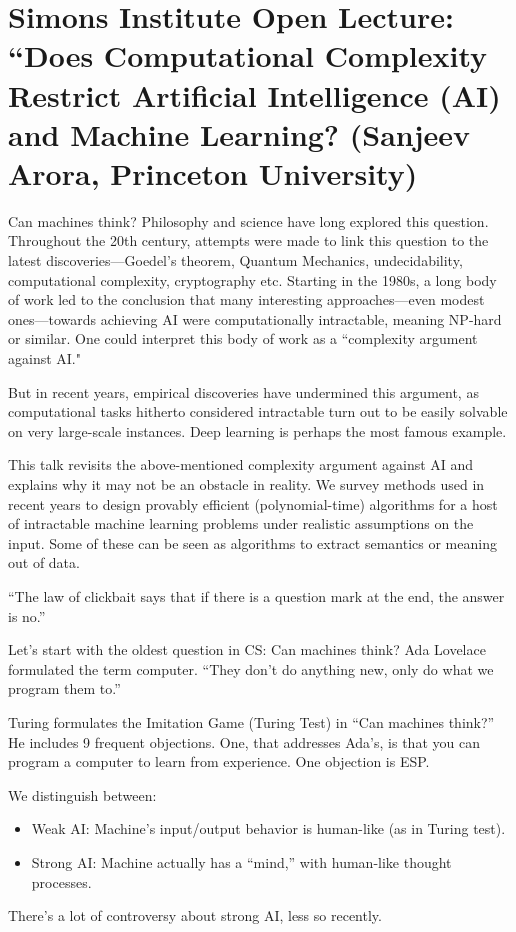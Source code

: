 \section{Simons Institute Open Lecture: ``Does Computational Complexity Restrict Artificial Intelligence (AI) and Machine Learning?  (Sanjeev Arora, Princeton University)}

Can machines think? Philosophy and science have long explored this question. Throughout the 20th century, attempts were made to link this question to the latest discoveries---Goedel's theorem, Quantum Mechanics, undecidability, computational complexity, cryptography etc. Starting in the 1980s, a long body of work led to the conclusion that many interesting approaches---even modest ones---towards achieving AI were computationally intractable, meaning NP-hard or similar. One could interpret this body of work as a ``complexity argument against AI."

But in recent years, empirical discoveries have undermined this argument, as computational tasks hitherto considered intractable turn out to be easily solvable on very large-scale instances. Deep learning is perhaps the most famous example.

This talk revisits the above-mentioned complexity argument against AI and explains why it may not be an obstacle in reality. We survey methods used in recent years to design provably efficient (polynomial-time) algorithms for a host of intractable machine learning problems under realistic assumptions on the input. Some of these can be seen as algorithms to extract semantics or meaning out of data.

``The law of clickbait says that if there is a question mark at the end, the answer is no.''

Let's start with the oldest question in CS: Can machines think?
Ada Lovelace formulated the term computer. ``They don't do anything new, only do what we program them to.''

Turing formulates the Imitation Game (Turing Test) in ``Can machines think?'' He includes 9 frequent objections. One, that addresses Ada's, is that you can program a computer to learn from experience. One objection is ESP.

We distinguish between:
\begin{itemize}
\item
Weak AI: Machine's input/output behavior is human-like (as in Turing test).
\item
Strong AI: Machine actually has a ``mind,'' with human-like thought processes. %
\end{itemize}
There's a lot of controversy about strong AI, less so recently.

